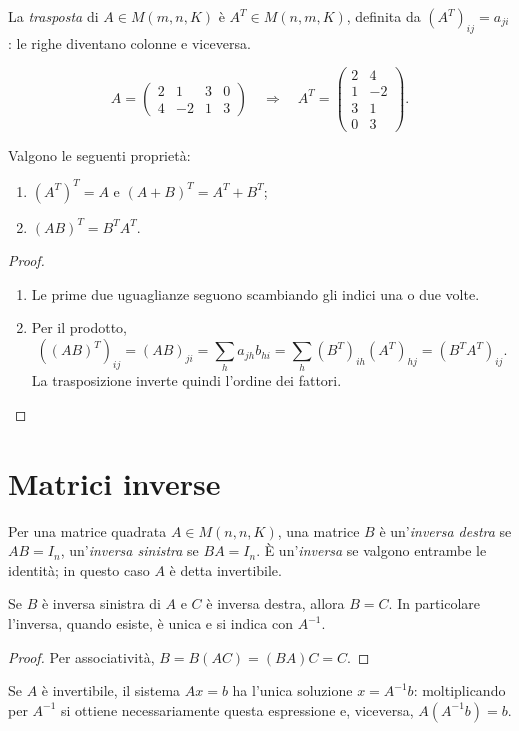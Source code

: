 \begin{definizione}
La \emph{trasposta} di $A\in M(m,n,K)$ è $A^T\in M(n,m,K)$, definita da $(A^T)_{ij}=a_{ji}$: le righe diventano colonne e viceversa.
\end{definizione}
\begin{esempio}
\[
 A=\begin{pmatrix}2&1&3&0\\4&-2&1&3\end{pmatrix}
 \quad\Longrightarrow\quad
 A^T=\begin{pmatrix}2&4\\1&-2\\3&1\\0&3\end{pmatrix}.
\]
\end{esempio}
\begin{proposizione}
Valgono le seguenti proprietà:
\begin{enumerate}[label=\arabic*.]
\item $(A^T)^T=A$ e $(A+B)^T=A^T+B^T$;
\item $(AB)^T=B^TA^T$.
\end{enumerate}
\end{proposizione}
\begin{proof}
\begin{enumerate}[label=\arabic*.]
\item Le prime due uguaglianze seguono scambiando gli indici una o due volte.
\item Per il prodotto,
\[
 ((AB)^T)_{ij}=(AB)_{ji}=\sum_h a_{jh}b_{hi}
 =\sum_h (B^T)_{ih}(A^T)_{hj}=(B^TA^T)_{ij}.
\]
La trasposizione inverte quindi l'ordine dei fattori.
\end{enumerate}
\end{proof}

\section{Matrici inverse}
\begin{definizione}
Per una matrice quadrata $A\in M(n,n,K)$, una matrice $B$ è un'\emph{inversa destra} se $AB=I_n$, un'\emph{inversa sinistra} se $BA=I_n$. È un'\emph{inversa} se valgono entrambe le identità; in questo caso $A$ è detta invertibile.
\end{definizione}
\begin{proposizione}
Se $B$ è inversa sinistra di $A$ e $C$ è inversa destra, allora $B=C$. In particolare l'inversa, quando esiste, è unica e si indica con $A^{-1}$.
\end{proposizione}
\begin{proof}
Per associatività, $B=B(AC)=(BA)C=C$.
\end{proof}
Se $A$ è invertibile, il sistema $Ax=b$ ha l'unica soluzione $x=A^{-1}b$: moltiplicando per $A^{-1}$ si ottiene necessariamente questa espressione e, viceversa, $A(A^{-1}b)=b$.


